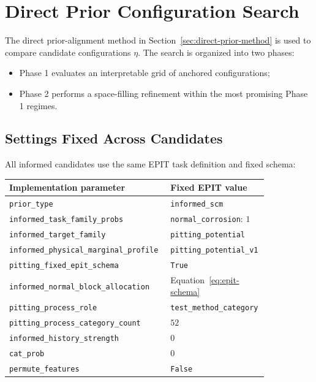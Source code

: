 \documentclass{article}
\begin{document}
\section{Direct Prior Configuration Search}
\label{sec:configuration-search}

The direct prior-alignment method in Section~\ref{sec:direct-prior-method} is used to compare candidate configurations \(\eta\). The search is organized into two phases:

\begin{itemize}
    \item Phase 1 evaluates an interpretable grid of anchored configurations;
    \item Phase 2 performs a space-filling refinement within the most promising Phase 1 regimes.
\end{itemize}

\subsection{Settings Fixed Across Candidates}

All informed candidates use the same EPIT task definition and fixed schema:

\begin{center}
\small
\begin{tabular}{p{0.57\linewidth}p{0.27\linewidth}}
\hline
\textbf{Implementation parameter} & \textbf{Fixed EPIT value} \\
\hline
\texttt{prior\_type} & \texttt{informed\_scm} \\
\texttt{informed\_task\_family\_probs} & \texttt{normal\_corrosion}: \(1\) \\
\texttt{informed\_target\_family} & \texttt{pitting\_potential} \\
\texttt{informed\_physical\_marginal\_profile} & \texttt{pitting\_potential\_v1} \\
\texttt{pitting\_fixed\_epit\_schema} & \texttt{True} \\
\texttt{informed\_normal\_block\_allocation} & Equation~\eqref{eq:epit-schema} \\
\texttt{pitting\_process\_role} & \texttt{test\_method\_category} \\
\texttt{pitting\_process\_category\_count} & \(52\) \\
\texttt{informed\_history\_strength} & \(0\) \\
\texttt{cat\_prob} & \(0\) \\
\texttt{permute\_features} & \texttt{False} \\
\hline
\end{tabular}
\end{center}
\end{document}
